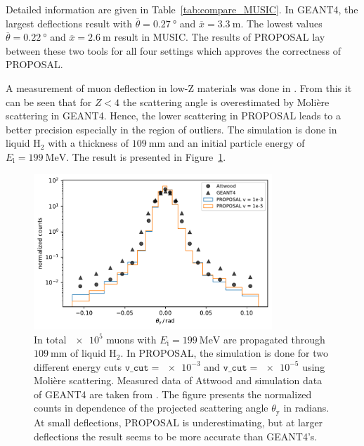 Detailed information are given in Table~\ref{tab:compare_MUSIC}. In GEANT4, the 
largest deflections result with $\overline{\theta} = \SI{0.27}{\degree}$ 
and $\overline{x} = \SI{3.3}{\meter}$. The lowest values $\overline{\theta} = \SI{0.22}{\degree}$ and 
$\overline{x} = \SI{2.6}{\meter}$ result in MUSIC. The results of PROPOSAL lay between 
these two tools for all four settings which approves the 
correctness of PROPOSAL.

A measurement of muon deflection in low-Z materials was done in \cite{attwood_2006}. 
From this it can be seen that for $Z < 4$ the scattering angle is overestimated 
by Molière scattering in GEANT4. Hence, the lower scattering in PROPOSAL leads 
to a better precision especially in the region of outliers. The simulation is 
done in liquid $\text{H}_2$ with a thickness of $\SI{109}{\milli\meter}$ and an 
initial particle energy of $E_{\mathrm{i}} = \SI{199}{\mega\electronvolt}$. 
The result is presented in Figure~\ref{fig:attwood_comparison}.
\begin{figure}
    \centering 
    \includegraphics[width=0.8\textwidth]{../../deflection/plots/FINAL/attwood_comparison_moliere_E199MeV_final.pdf}
    \caption{In total $\num{e5}$ muons with $E_{\mathrm{i}} = \SI{199}{\mega\electronvolt}$ are propagated through 
    $\SI{109}{\milli\meter}$ of liquid $\text{H}_2$. In PROPOSAL, the simulation is done 
    for two different energy cuts $\texttt{v\_cut} = \num{e-3}$ and $\texttt{v\_cut} = \num{e-5}$ using Molière scattering.
    Measured data of Attwood and simulation data of GEANT4 are taken from \cite{attwood_2006}. The figure presents 
    the normalized counts in dependence of the projected scattering angle $\theta_{\mathrm{y}}$ in radians. At small deflections, PROPOSAL 
    is underestimating, but at larger deflections the result seems to be more accurate than GEANT4's.}
    \label{fig:attwood_comparison}
\end{figure}

